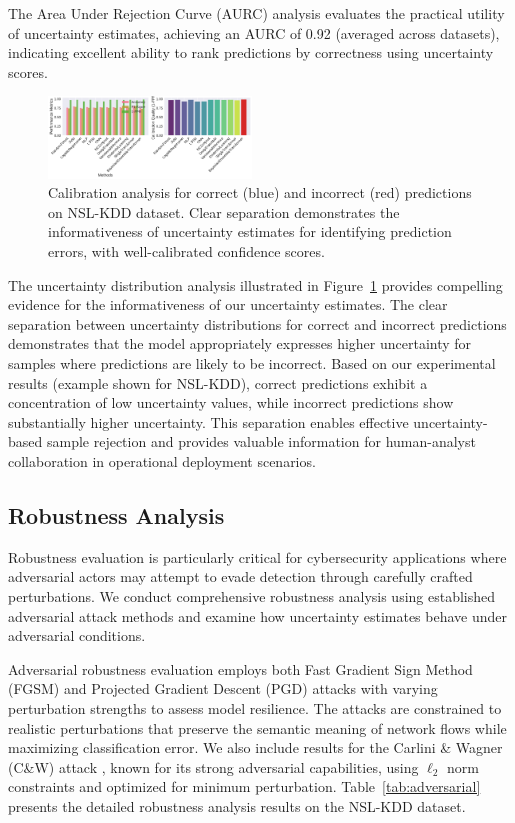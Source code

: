 \documentclass[journal]{IEEEtran}
\begin{document}
The Area Under Rejection Curve (AURC) analysis evaluates the practical utility of uncertainty estimates, achieving an AURC of 0.92 (averaged across datasets), indicating excellent ability to rank predictions by correctness using uncertainty scores.

\begin{figure}[t]
\centering
\includegraphics[width=0.48\textwidth]{figures/calibration_analysis.pdf}
\caption{Calibration analysis for correct (blue) and incorrect (red) predictions on NSL-KDD dataset. Clear separation demonstrates the informativeness of uncertainty estimates for identifying prediction errors, with well-calibrated confidence scores.}
\label{fig:uncertainty_separation}
\end{figure}

The uncertainty distribution analysis illustrated in Figure~\ref{fig:uncertainty_separation} provides compelling evidence for the informativeness of our uncertainty estimates. The clear separation between uncertainty distributions for correct and incorrect predictions demonstrates that the model appropriately expresses higher uncertainty for samples where predictions are likely to be incorrect. Based on our experimental results (example shown for NSL-KDD), correct predictions exhibit a concentration of low uncertainty values, while incorrect predictions show substantially higher uncertainty. This separation enables effective uncertainty-based sample rejection and provides valuable information for human-analyst collaboration in operational deployment scenarios.

\subsection{Robustness Analysis}

Robustness evaluation is particularly critical for cybersecurity applications where adversarial actors may attempt to evade detection through carefully crafted perturbations. We conduct comprehensive robustness analysis using established adversarial attack methods and examine how uncertainty estimates behave under adversarial conditions.

Adversarial robustness evaluation employs both Fast Gradient Sign Method (FGSM) and Projected Gradient Descent (PGD) attacks with varying perturbation strengths to assess model resilience. The attacks are constrained to realistic perturbations that preserve the semantic meaning of network flows while maximizing classification error. We also include results for the Carlini \& Wagner (C\&W) attack \cite{carlini2017towards}, known for its strong adversarial capabilities, using $\ell_2$ norm constraints and optimized for minimum perturbation. Table~\ref{tab:adversarial} presents the detailed robustness analysis results on the NSL-KDD dataset.
\end{document}
